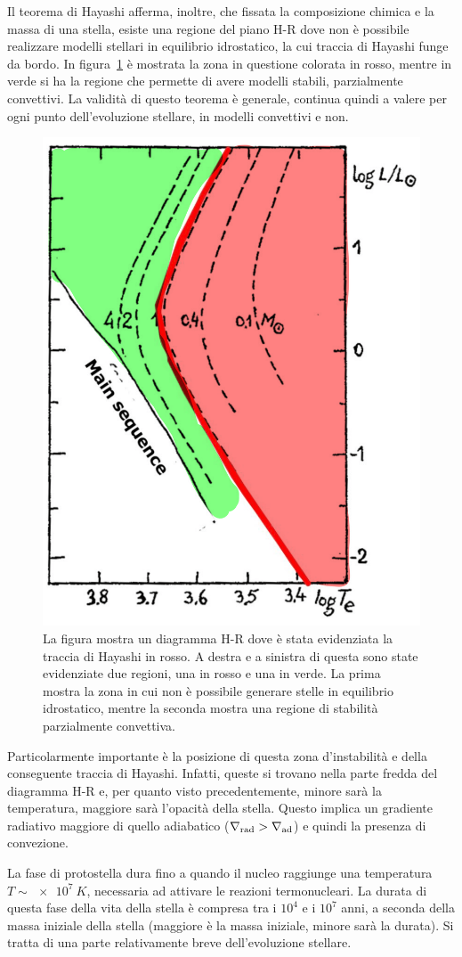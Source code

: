 Il teorema di Hayashi afferma, inoltre, che fissata la composizione chimica e la massa di una stella, esiste una regione del piano H-R dove non è possibile realizzare modelli stellari in equilibrio idrostatico, la cui traccia di Hayashi funge da bordo. In figura~\ref{fig:hay} è mostrata la zona in questione colorata in rosso, mentre in verde si ha la regione che permette di avere modelli stabili, parzialmente convettivi. La validità di questo teorema è generale,  continua quindi a valere per ogni punto dell'evoluzione stellare, in modelli convettivi e non.

\begin{figure}
    \centering
    \includegraphics[width = 0.3 \textwidth]{immagini/hayashi-1.png}
    \caption{La figura mostra un diagramma H-R dove è stata evidenziata la traccia di Hayashi in rosso. A destra e a sinistra di questa sono state evidenziate due regioni, una in rosso e una in verde. La prima mostra la zona in cui non è possibile generare stelle in equilibrio idrostatico, mentre la seconda mostra una regione di stabilità parzialmente convettiva.}\label{fig:hay}
\end{figure}

Particolarmente importante è la posizione di questa zona d'instabilità e della conseguente traccia di Hayashi. Infatti, queste si trovano nella parte fredda del diagramma H-R e, per quanto visto precedentemente, minore sarà la temperatura, maggiore sarà l'opacità della stella. Questo implica un gradiente radiativo maggiore di quello adiabatico ($\nabla_\textup{rad} > \nabla_\textup{ad}$) e quindi la presenza di convezione.

La fase di protostella dura fino a quando il nucleo raggiunge una temperatura $T \sim \SI{e7}{K}$, necessaria ad attivare le reazioni termonucleari. La durata di questa fase della vita della stella è compresa tra i $10^4$ e i $10^7$ anni, a seconda della massa iniziale della stella (maggiore è la massa iniziale, minore sarà la durata). Si tratta di una parte relativamente breve dell'evoluzione stellare.